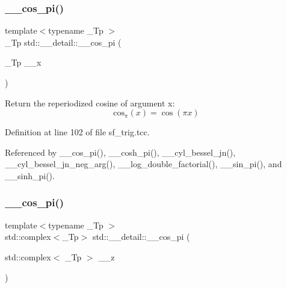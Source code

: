 \mbox{\label{namespacestd_1_1____detail_abfdaa500e1321747a0ad391ca3416a0b}} 
\subsubsection{\texorpdfstring{\+\_\+\+\_\+cos\+\_\+pi()}{\_\_cos\_pi()}\hspace{0.1cm}{\footnotesize\ttfamily [1/2]}}
{\footnotesize\ttfamily template$<$typename \+\_\+\+Tp $>$ \\
\+\_\+\+Tp std\+::\+\_\+\+\_\+detail\+::\+\_\+\+\_\+cos\+\_\+pi (\begin{DoxyParamCaption}\item[{\+\_\+\+Tp}]{\+\_\+\+\_\+x }\end{DoxyParamCaption})}

Return the reperiodized cosine of argument x\+: \[ \mathrm{cos_\pi}(x) = \cos(\pi x) \] 

Definition at line 102 of file sf\+\_\+trig.\+tcc.



Referenced by \+\_\+\+\_\+cos\+\_\+pi(), \+\_\+\+\_\+cosh\+\_\+pi(), \+\_\+\+\_\+cyl\+\_\+bessel\+\_\+jn(), \+\_\+\+\_\+cyl\+\_\+bessel\+\_\+jn\+\_\+neg\+\_\+arg(), \+\_\+\+\_\+log\+\_\+double\+\_\+factorial(), \+\_\+\+\_\+sin\+\_\+pi(), and \+\_\+\+\_\+sinh\+\_\+pi().

\mbox{\label{namespacestd_1_1____detail_a0332c7fb29ed7be543103adc8d04d39d}} 
\subsubsection{\texorpdfstring{\+\_\+\+\_\+cos\+\_\+pi()}{\_\_cos\_pi()}\hspace{0.1cm}{\footnotesize\ttfamily [2/2]}}
{\footnotesize\ttfamily template$<$typename \+\_\+\+Tp $>$ \\
std\+::complex$<$\+\_\+\+Tp$>$ std\+::\+\_\+\+\_\+detail\+::\+\_\+\+\_\+cos\+\_\+pi (\begin{DoxyParamCaption}\item[{std\+::complex$<$ \+\_\+\+Tp $>$}]{\+\_\+\+\_\+z }\end{DoxyParamCaption})}

